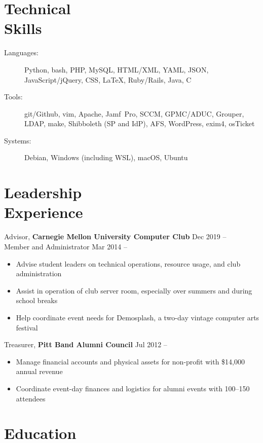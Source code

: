 \documentclass[11pt]{article}
\newcommand{\textdb}[1]{\fontseries{db}\selectfont#1\normalfont}
\newcommand{\present}{\phantom{Xxx 20XX}}
\newcommand{\itemizeonly}{\leavevmode\par\vspace{\dimexpr-\baselineskip-\parskip}}
\begin{document}
\section{Technical\\ Skills}

\itemizeonly
\begin{description}
	\item[\textdb{Languages:}] Python, bash, PHP, MySQL, HTML/XML, YAML, JSON,
		JavaScript/jQuery, CSS, \LaTeX, Ruby/Rails, Java, C
	\item[\textdb{Tools:}] git/Github, vim, Apache,
		Jamf~Pro, SCCM, GPMC/ADUC, Grouper, LDAP, make,
		Shibboleth (SP and IdP), AFS, WordPress, exim4, osTicket
	\item[\textdb{Systems:}] Debian, Windows (including WSL), macOS, Ubuntu
\end{description}



\section{Leadership\\ Experience}

\textdb{
Advisor,
\textbf{Carnegie Mellon University Computer Club}
	\hfill Dec 2019 -- \present \\
}
\textdb{
Member and Administrator
	\hfill Mar 2014 -- \present
}
\begin{itemize}
	\item Advise student leaders on technical operations,
		resource usage, and club administration
	\item Assist in operation of club server room,
		especially over summers and during school breaks
	\item Help coordinate event needs for Demosplash,
		a two-day vintage computer arts festival
\end{itemize}

\textdb{
Treasurer,
\textbf{Pitt Band Alumni Council}
	\hfill Jul 2012 -- \present
}
\begin{itemize}
	\item Manage financial accounts and physical assets
		for non-profit with \$14,000 annual revenue
	\item Coordinate event-day finances and logistics for alumni events with 100--150 attendees
\end{itemize}



\section{Education}
\end{document}
